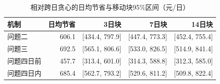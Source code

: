 \begin{table}[H]\centering\small
\caption{相对跨日贪心的日均节省与移动块95\%区间（元/日）}
\begin{tabular}{lrrrr}\toprule
机制 & 日均节省 & 3日块 & 7日块 & 14日块 \\ \midrule
问题二 & 606.1 & [434.4, 797.9] & [447.4, 773.3] & [452.4, 755.4] \\
问题三 & 692.5 & [565.1, 806.6] & [533.0, 826.5] & [514.9, 841.4] \\
问题四日前 & 457.7 & [313.4, 601.0] & [314.3, 588.8] & [312.3, 585.0] \\
问题四日内 & 685.4 & [562.7, 793.2] & [529.6, 811.2] & [509.8, 822.4] \\
\bottomrule\end{tabular}\end{table}
